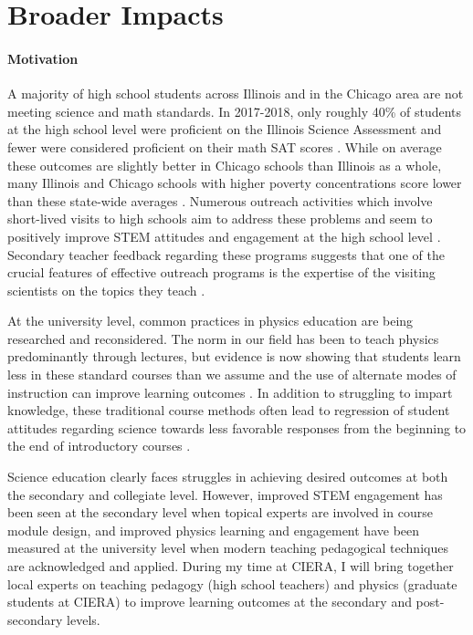 \documentclass[11pt, preprint]{aastex}
\begin{document}
\section{Broader Impacts}
\vspace{-6pt}
\label{sct:broader_impacts}

\paragraph{Motivation}
A majority of high school students across Illinois and in the Chicago area are not meeting science and math standards.
In 2017-2018, only roughly 40\% of students at the high school level were proficient on the Illinois Science Assessment and fewer were considered proficient on their math SAT scores \citep{irc2018}.
While on average these outcomes are slightly better in Chicago schools than Illinois as a whole, many Illinois and Chicago schools with higher poverty concentrations score lower than these state-wide averages \citep{stevens&all2015}.  
Numerous outreach activities which involve short-lived visits to high schools aim to address these problems and seem to positively improve STEM attitudes and engagement at the high school level \citep{vennix&all2017, vennix&all2018}.
Secondary teacher feedback regarding these programs suggests that one of the crucial features of effective outreach programs is the expertise of the visiting scientists on the topics they teach \citep{laursen&all2007}.

At the university level, common practices in physics education are being researched and reconsidered.
The norm in our field has been to teach physics predominantly through lectures, but evidence is now showing that students learn less in these standard courses than we assume and the use of alternate modes of instruction can improve learning outcomes \citep{meltzer&thornton2012}.
In addition to struggling to impart knowledge, these traditional course methods often lead to regression of student attitudes regarding science towards less favorable responses from the beginning to the end of introductory courses \citep{reddish&all1998}.

Science education clearly faces struggles in achieving desired outcomes at both the secondary and collegiate level.
However, improved STEM engagement has been seen at the secondary level when topical experts are involved in course module design, and improved physics learning and engagement have been measured at the university level when modern teaching pedagogical techniques are acknowledged and applied.
During my time at CIERA, I will bring together local experts on teaching pedagogy (high school teachers) and physics (graduate students at CIERA) to improve learning outcomes at the secondary and post-secondary levels.
\end{document}
